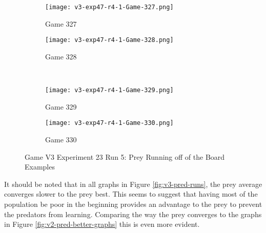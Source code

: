 \begin{figure}
  \centering
  \begin{subfigure}{0.4\textwidth}
    \centering
    \texttt{[image: v3-exp47-r4-1-Game-327.png]}
    \caption{Game 327}
  \end{subfigure}
  \begin{subfigure}{0.4\textwidth}
    \centering
    \texttt{[image: v3-exp47-r4-1-Game-328.png]}
    \caption{Game 328}
  \end{subfigure} \\\hfill
  
  \begin{subfigure}{0.4\textwidth}
    \centering
    \texttt{[image: v3-exp47-r4-1-Game-329.png]}
    \caption{Game 329}
  \end{subfigure}
  \begin{subfigure}{0.4\textwidth}
    \centering
    \texttt{[image: v3-exp47-r4-1-Game-330.png]}
    \caption{Game 330}
  \end{subfigure}
  \caption{Game V3 Experiment 23 Run 5: Prey Running off of the Board Examples\label{fig:v3-prey-running-off-board}}
\end{figure}

It should be noted that in all graphs in Figure \ref{fig:v3-pred-runs}, the prey average converges slower to the prey best. This seems to suggest that having most of the population be poor in the beginning provides an advantage to the prey to prevent the predators from learning. Comparing the way the prey converges to the graphs in Figure \ref{fig:v2-pred-better-graphs} this is even more evident.




